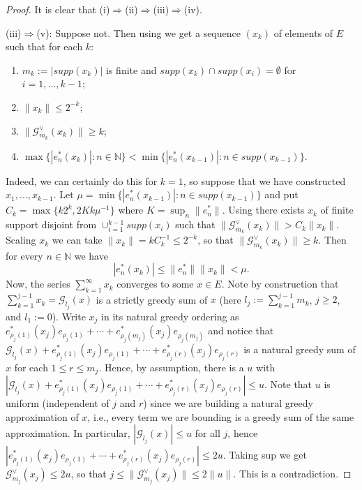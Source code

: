 \documentclass[12pt,leqno]{amsart}
\numberwithin{equation}{section}
\theoremstyle{definition}
\def\N{{\mathbb N}}
\begin{document}
\begin{proof}
It is clear that (i)$\Rightarrow$(ii)$\Rightarrow$(iii)$\Rightarrow$(iv).
\medskip

 (iii)$\Rightarrow$(v): Suppose not. Then using  we get a sequence $(x_k)$ of elements of $E$ such that for each $k$:
\begin{enumerate}
\item[(a)] $m_k:=|supp(x_k)|$ is finite and $supp(x_k)\cap supp(x_i)=\emptyset$ for $i=1,\dots, k-1$;
\item[(b)] $\|x_k\|\leq 2^{-k}$;
\item[(c)] $\|\mathcal{G}_{m_k}^\vee(x_k)\|\geq k$;
\item[(d)] $\max \{|e_n^*(x_k)| :n\in \N \}<\min \{|e_n^*(x_{k-1})| : n\in supp(x_{k-1})\}.$
\end{enumerate}
Indeed, we can certainly do this for $k=1$, so suppose that we have constructed $x_1,\dots, x_{k-1}$. Let $\mu=\min\{|e_n^*(x_{k-1})|: n\in supp(x_{k-1})\}$ and put $C_k=\max\{k2^k, 2Kk\mu^{-1}\}$ where $K=\sup_n\|e_n^*\|$. Using  there exists $x_k$ of finite support disjoint from $\cup_{i=1}^{k-1}supp(x_i)$  such that $\|\mathcal{G}_{m_k}^\vee(x_k)\|>C_k\|x_k\|$. Scaling $x_k$ we can take $\|x_k\|=kC_k^{-1}\leq 2^{-k}$, so that $\|\mathcal{G}_{m_k}^\vee(x_k)\|\geq k$.  Then for every $n\in \N$ we have
$$|e_n^*(x_k)|\leq \|e_n^*\|\|x_k\|<\mu.$$
Now, the series $\sum_{k=1}^\infty x_k$ converges to some $x\in E$. Note by construction that $\sum_{k=1}^{j-1}x_k=\mathcal{G}_{l_j}(x)$ is a strictly greedy sum of $x$ (here $l_j:=\sum_{k=1}^{j-1}m_k$, $j\geq 2$, and $l_1:=0$). Write $x_j$ in its natural greedy ordering as $e_{\rho_j(1)}^*(x_j)e_{\rho_j(1)}+\cdots + e_{\rho_j(m_j)}^*(x_j)e_{\rho_j(m_j)}$ and notice that $\mathcal{G}_{l_j}(x)+e_{\rho_j(1)}^*(x_j)e_{\rho_j(1)}+\cdots +e_{\rho_j(r)}^*(x_j)e_{\rho_j(r)}$ is a natural greedy sum of $x$  for each $1\leq r\leq m_j$. Hence, by assumption, there is a $u$ with $|\mathcal{G}_{l_j}(x)+e_{\rho_j(1)}^*(x_j)e_{\rho_j(1)}+\cdots +e_{\rho_j(r)}^*(x_j)e_{\rho_j(r)}|\leq u$. Note that $u$ is uniform (independent of $j$ and $r$) since we are building a natural greedy approximation of $x$, i.e., every term we are bounding is a greedy sum of the same approximation. In particular, $|\mathcal{G}_{l_j}(x)|\leq u$ for all $j$, hence $|e_{\rho_j(1)}^*(x_j)e_{\rho_j(1)}+\cdots +e_{\rho_j(r)}^*(x_j)e_{\rho_j(r)}|\leq 2u$. Taking sup we get $\mathcal{G}_{m_j}^\vee(x_j)\leq 2u$, so that $j\leq \|\mathcal{G}_{m_j}^\vee(x_j)\|\leq 2\|u\|$. This is a contradiction. 
\medskip


\end{proof}
\end{document}
